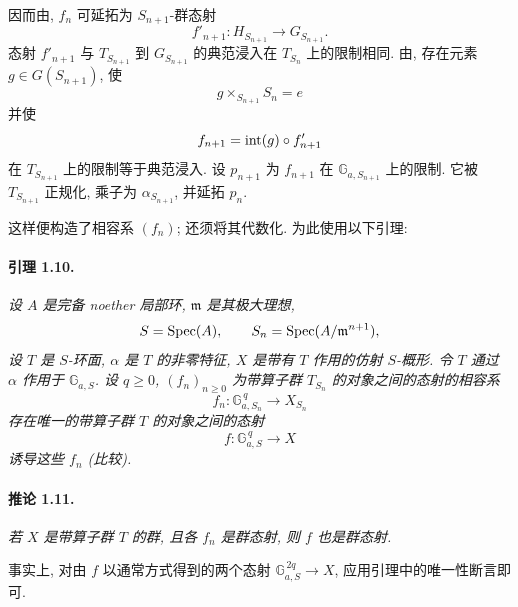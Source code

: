 因而由, \(f_n\) 可延拓为 \(S_{n+1}\)-群态射
\[
  f'_{n+1}\colon H_{S_{n+1}}\longrightarrow G_{S_{n+1}}.
\]
态射 \(f'_{n+1}\) 与 \(T_{S_{n+1}}\) 到 \(G_{S_{n+1}}\) 的典范浸入在 \(T_{S_n}\) 上的限制相同. 由, 存在元素 \(g\in G(S_{n+1})\), 使
\[
  g\times_{S_{n+1}}S_n=e
\]
并使
\[
  f_{n+1}=\operatorname{int}(g)\circ f'_{n+1}
\]
在 \(T_{S_{n+1}}\) 上的限制等于典范浸入. 设 \(p_{n+1}\) 为 \(f_{n+1}\) 在 \(\mathbb G_{a,S_{n+1}}\) 上的限制. 它被 \(T_{S_{n+1}}\) 正规化, 乘子为 \(\alpha_{S_{n+1}}\), 并延拓 \(p_n\).

这样便构造了相容系 \((f_n)\); 还须将其代数化. 为此使用以下引理:

\paragraph{\textbf{引理 1.10.}}
\emph{设 \(A\) 是完备 noether 局部环, \(\mathfrak m\) 是其极大理想,
\[
  S=\operatorname{Spec}(A),\qquad S_n=\operatorname{Spec}(A/\mathfrak m^{n+1}),
\]
设 \(T\) 是 \(S\)-环面, \(\alpha\) 是 \(T\) 的非零特征, \(X\) 是带有 \(T\) 作用的仿射 \(S\)-概形. 令 \(T\) 通过 \(\alpha\) 作用于 \(\mathbb G_{a,S}\). 设 \(q\geq0\), \((f_n)_{n\geq0}\) 为带算子群 \(T_{S_n}\) 的对象之间的态射的相容系}
\[
  f_n\colon\mathbb G_{a,S_n}^{\,q}\longrightarrow X_{S_n}
\]
\emph{存在唯一的带算子群 \(T\) 的对象之间的态射}
\[
  f\colon\mathbb G_{a,S}^{\,q}\longrightarrow X
\]
\emph{诱导这些 \(f_n\) \textup{(比较)}.}

\paragraph{\textbf{推论 1.11.}}
\emph{若 \(X\) 是带算子群 \(T\) 的群, 且各 \(f_n\) 是群态射, 则 \(f\) 也是群态射.}

事实上, 对由 \(f\) 以通常方式得到的两个态射 \(\mathbb G_{a,S}^{\,2q}\to X\), 应用引理中的唯一性断言即可.

